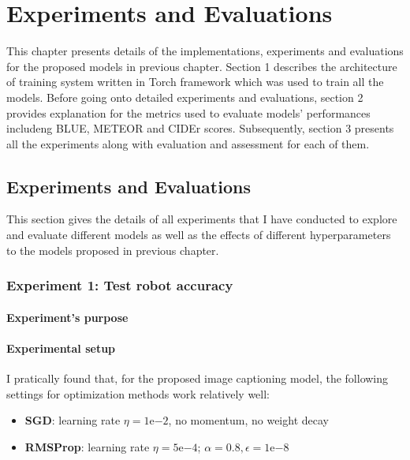 \chapter{Experiments and Evaluations}
\label{ch:experiments}

This chapter presents details of the implementations, experiments and evaluations for the proposed models in previous chapter. Section 1 describes the architecture of training system written in Torch framework which was used to train all the models. Before going onto detailed experiments and evaluations, section 2 provides explanation for the metrics used to evaluate models' performances includeng BLUE, METEOR and CIDEr scores. Subsequently, section 3 presents all the experiments along with evaluation and assessment for each of them.



\section{Experiments and Evaluations}
\label{sec:chap4_experiment}

This section gives the details of all experiments that I have conducted to explore and evaluate different models as well as the effects of different hyperparameters to the models proposed in previous chapter. 


\subsection{Experiment 1: Test robot accuracy}
\subsubsection{Experiment's purpose}

\subsubsection{Experimental setup}
I pratically found that, for the proposed image captioning model, the following settings for optimization methods work relatively well:
	\begin{itemize}
		\item \textbf{SGD}: learning rate $\eta = 1\mathrm{e}{-2}$, no momentum, no weight decay
		\item \textbf{RMSProp}: learning rate $\eta = 5\mathrm{e}{-4}$; $\alpha = 0.8, \epsilon = 1\mathrm{e}{-8}$
	\end{itemize}

